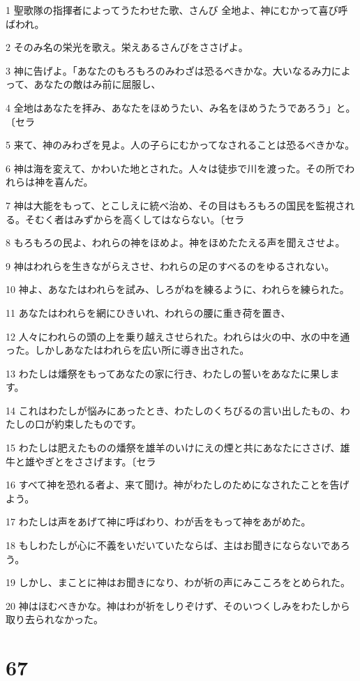 \par 1 聖歌隊の指揮者によってうたわせた歌、さんび 全地よ、神にむかって喜び呼ばわれ。
\par 2 そのみ名の栄光を歌え。栄えあるさんびをささげよ。
\par 3 神に告げよ。「あなたのもろもろのみわざは恐るべきかな。大いなるみ力によって、あなたの敵はみ前に屈服し、
\par 4 全地はあなたを拝み、あなたをほめうたい、み名をほめうたうであろう」と。〔セラ
\par 5 来て、神のみわざを見よ。人の子らにむかってなされることは恐るべきかな。
\par 6 神は海を変えて、かわいた地とされた。人々は徒歩で川を渡った。その所でわれらは神を喜んだ。
\par 7 神は大能をもって、とこしえに統べ治め、その目はもろもろの国民を監視される。そむく者はみずからを高くしてはならない。〔セラ
\par 8 もろもろの民よ、われらの神をほめよ。神をほめたたえる声を聞えさせよ。
\par 9 神はわれらを生きながらえさせ、われらの足のすべるのをゆるされない。
\par 10 神よ、あなたはわれらを試み、しろがねを練るように、われらを練られた。
\par 11 あなたはわれらを網にひきいれ、われらの腰に重き荷を置き、
\par 12 人々にわれらの頭の上を乗り越えさせられた。われらは火の中、水の中を通った。しかしあなたはわれらを広い所に導き出された。
\par 13 わたしは燔祭をもってあなたの家に行き、わたしの誓いをあなたに果します。
\par 14 これはわたしが悩みにあったとき、わたしのくちびるの言い出したもの、わたしの口が約束したものです。
\par 15 わたしは肥えたものの燔祭を雄羊のいけにえの煙と共にあなたにささげ、雄牛と雄やぎとをささげます。〔セラ
\par 16 すべて神を恐れる者よ、来て聞け。神がわたしのためになされたことを告げよう。
\par 17 わたしは声をあげて神に呼ばわり、わが舌をもって神をあがめた。
\par 18 もしわたしが心に不義をいだいていたならば、主はお聞きにならないであろう。
\par 19 しかし、まことに神はお聞きになり、わが祈の声にみこころをとめられた。
\par 20 神はほむべきかな。神はわが祈をしりぞけず、そのいつくしみをわたしから取り去られなかった。

\chapter{67}

